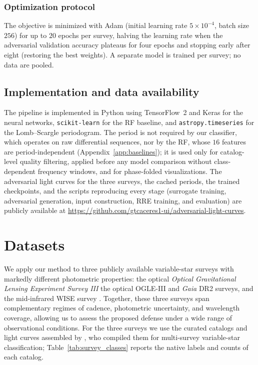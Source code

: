 \documentclass{aa}
\begin{document}
\subsubsection{Optimization protocol} \label{sec:optim}

The objective is minimized with Adam \citep{kingma2014adam} (initial learning rate $5 \times 10^{-4}$, batch size $256$) for up to $20$ epochs per survey, halving the learning rate when the adversarial validation accuracy plateaus for four epochs and stopping early after eight (restoring the best weights). A separate model is trained per survey; no data are pooled.

\subsection{Implementation and data availability} \label{sec:implementation}

The pipeline is implemented in Python using TensorFlow~2 and Keras for the neural networks, \texttt{scikit-learn} \citep{pedregosa2011scikit} for the RF baseline, and \texttt{astropy.timeseries} \citep{astropy2022} for the Lomb--Scargle periodogram. The period is not required by our classifier, which operates on raw differential sequences, nor by the RF, whose $16$ features are period-independent (Appendix~\ref{app:baselines}); it is used only for catalog-level quality filtering, applied before any model comparison without class-dependent frequency windows, and for phase-folded visualizations. The adversarial light curves for the three surveys, the cached periods, the trained checkpoints, and the scripts reproducing every stage (surrogate training, adversarial generation, input construction, RRE training, and evaluation) are publicly available at \url{https://github.com/gtcaceres1-ui/adversarial-light-curves}.


\section{Datasets} \label{datasets}

We apply our method to three publicly available variable-star surveys with markedly different photometric properties: the optical \emph{Optical Gravitational Lensing Experiment Survey III} the optical OGLE-III \citep{udalski2004optical, udalski2008ogle} and \textit{Gaia} DR2 \citep{gaia2018gaia} surveys, and the mid-infrared WISE survey \citep{wright2010wide}. Together, these three surveys span complementary regimes of cadence, photometric uncertainty, and wavelength coverage, allowing us to assess the proposed defense under a wide range of observational conditions. For the three surveys we use the curated catalogs and light curves assembled by \citet{becker2020scalable}, who compiled them for multi-survey variable-star classification; Table~\ref{tab:survey_classes} reports the native labels and counts of each catalog.
\end{document}
